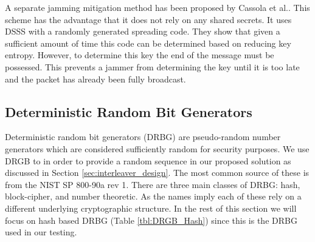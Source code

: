 \documentclass[sigconf]{acmart}
\begin{document}
A separate jamming mitigation method has been proposed by Cassola et al.\cite{cassola2012efficient}. This scheme has the advantage that it does not rely on any shared secrets. It uses DSSS with a randomly generated spreading code. They show that given a sufficient amount of time this code can be determined based on reducing key entropy. However, to determine this key the end of the message must be possessed. This prevents a jammer from determining the key until it is too late and the packet has already been fully broadcast. 

\subsection{Deterministic Random Bit Generators}

Deterministic random bit generators (DRBG) are pseudo-random number generators which are considered sufficiently random for security purposes. We use DRGB to in order to provide a random sequence in our proposed solution as discussed in Section \ref{sec:interleaver_design}. The most common source of these is from the NIST SP 800-90a rev 1\cite{barker2015nist90a}. There are three main classes of DRBG: hash, block-cipher, and number theoretic. As the names imply each of these rely on a different underlying cryptographic structure. In the rest of this section we will focus on hash based DRBG (Table \ref{tbl:DRGB_Hash}) since this is the DRBG used in our testing. 

\end{document}
